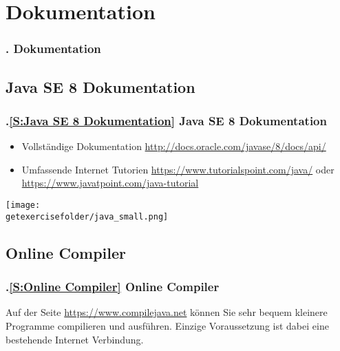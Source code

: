 \AtBeginSection{}
\section{Dokumentation}
\begin{frame}
  \frametitle{\kap. Dokumentation}%
\tableofcontents[current]
\end{frame}


\def\stitle{Java SE 8 Dokumentation}%
\subsection*{\stitle}\label{S:Java SE 8 Dokumentation}
\begin{frame}[t]%
  \frametitle{\kap.\ref{S:Java SE 8 Dokumentation} \stitle}%
\medskip

\begin{itemize}
\item Vollst\"andige Dokumentation \textcolor{KITblue}{\url{http://docs.oracle.com/javase/8/docs/api/}}
\item Umfassende Internet Tutorien \textcolor{KITblue}{\url{https://www.tutorialspoint.com/java/}} oder \textcolor{KITblue}{\url{https://www.javatpoint.com/java-tutorial}}
\end{itemize}
\medskip

\texttt{[image: \\getexercisefolder/java\_small.png]}
\end{frame}


\def\stitle{Online Compiler}%
\subsection*{\stitle}\label{S:Online Compiler}
\begin{frame}[t]%
  \frametitle{\kap.\ref{S:Online Compiler} \stitle}%
\medskip

Auf der Seite \textcolor{KITblue}{\url{https://www.compilejava.net}} k\"onnen Sie sehr bequem kleinere Programme compilieren und ausf\"uhren.
Einzige Voraussetzung ist dabei eine bestehende Internet Verbindung.
\end{frame}

